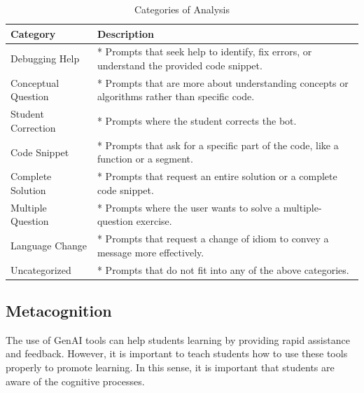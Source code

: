 \documentclass[a4paper,twoside]{article}
\begin{document}



\begin{table}[htbp]
  \caption{Categories of Analysis}
      \begin{center}
      \begin{tabular}{|p{4cm}|p{9cm}|}
      \hline
      \textbf{Category} & \textbf{Description} \\
      \hline
      Debugging Help & * Prompts that seek help to identify, fix errors, or understand the provided code snippet. \\
      Conceptual Question & * Prompts that are more about understanding concepts or algorithms rather than specific code. \\
      Student Correction & * Prompts where the student corrects the bot. \\
      \hline
      Code Snippet & * Prompts that ask for a specific part of the code, like a function or a segment. \\
      Complete Solution & * Prompts that request an entire solution or a complete code snippet. \\
      Multiple Question & * Prompts where the user wants to solve a multiple-question exercise. \\
      \hline
      Language Change & * Prompts that request a change of idiom to convey a message more effectively. \\
      Uncategorized & * Prompts that do not fit into any of the above categories. \\
      \hline
      \end{tabular}
      \label{tab:categories}
      \end{center}
  \end{table}


\subsection{Metacognition}

The use of GenAI tools can help students learning by providing rapid assistance
and feedback. However, it is important to teach students how to use these tools
properly to promote learning. In this sense, it is important that students are
aware of the cognitive processes.
\end{document}
